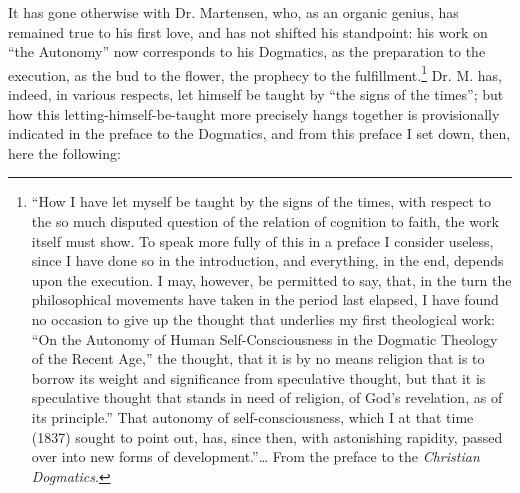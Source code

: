 \documentclass[12pt]{book}
\begin{document}
It has gone otherwise with Dr. Martensen, who, as an organic genius, has remained true to his first love, and has not shifted his standpoint: his work on ``the Autonomy'' now corresponds to his Dogmatics, as the preparation to the execution, as the bud to the flower, the prophecy to the fulfillment.\footnote{``How I have let myself be taught by the signs of the times, with respect to the so much disputed question of the relation of cognition to faith, the work itself must show. To speak more fully of this in a preface I consider useless, since I have done so in the introduction, and everything, in the end, depends upon the execution. I may, however, be permitted to say, that, in the turn the philosophical movements have taken in the period last elapsed, I have found no occasion to give up the thought that underlies my first theological work: ``On the Autonomy of Human Self-Consciousness in the Dogmatic Theology of the Recent Age,'' the thought, that it is by no means religion that is to borrow its weight and
significance from speculative thought, but that it is speculative thought that stands in need of religion, of God's revelation, as of its principle.'' That autonomy of self-consciousness, which I at that time (1837) sought to point out, has, since then, with astonishing rapidity, passed over into new forms of development.''\ldots{} From the preface to the \textit{Christian Dogmatics}.}
Dr. M. has, indeed, in various respects, let himself be taught by ``the signs of the times''; but how this letting-himself-be-taught more precisely hangs together is provisionally indicated in the preface to the Dogmatics, and from this preface I set down, then, here the following:
\end{document}
